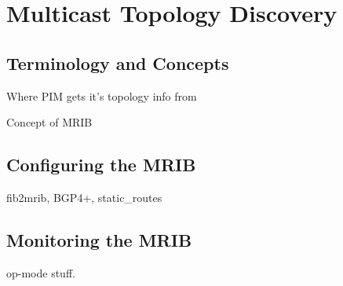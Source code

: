 %
%

\chapter{Multicast Topology Discovery}

\section{Terminology and Concepts}

Where PIM gets it's topology info from

Concept of MRIB

\section{Configuring the MRIB}

fib2mrib, BGP4+, static\_routes

\section{Monitoring the MRIB}

op-mode stuff.








